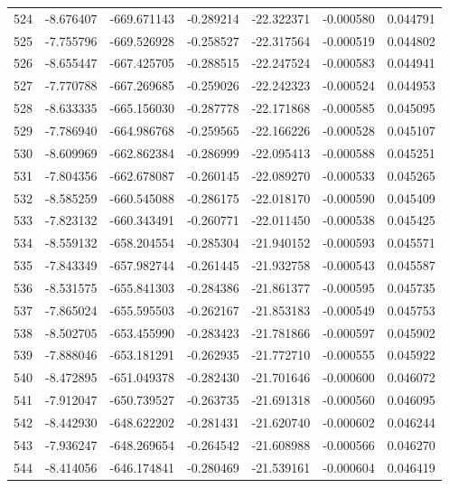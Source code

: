 \begin{tabular}{rrrrrrr}
 524 &  -8.676407 & -669.671143 & -0.289214 &  -22.322371 &   -0.000580 &  0.044791 \\
 525 &  -7.755796 & -669.526928 & -0.258527 &  -22.317564 &   -0.000519 &  0.044802 \\
 526 &  -8.655447 & -667.425705 & -0.288515 &  -22.247524 &   -0.000583 &  0.044941 \\
 527 &  -7.770788 & -667.269685 & -0.259026 &  -22.242323 &   -0.000524 &  0.044953 \\
 528 &  -8.633335 & -665.156030 & -0.287778 &  -22.171868 &   -0.000585 &  0.045095 \\
 529 &  -7.786940 & -664.986768 & -0.259565 &  -22.166226 &   -0.000528 &  0.045107 \\
 530 &  -8.609969 & -662.862384 & -0.286999 &  -22.095413 &   -0.000588 &  0.045251 \\
 531 &  -7.804356 & -662.678087 & -0.260145 &  -22.089270 &   -0.000533 &  0.045265 \\
 532 &  -8.585259 & -660.545088 & -0.286175 &  -22.018170 &   -0.000590 &  0.045409 \\
 533 &  -7.823132 & -660.343491 & -0.260771 &  -22.011450 &   -0.000538 &  0.045425 \\
 534 &  -8.559132 & -658.204554 & -0.285304 &  -21.940152 &   -0.000593 &  0.045571 \\
 535 &  -7.843349 & -657.982744 & -0.261445 &  -21.932758 &   -0.000543 &  0.045587 \\
 536 &  -8.531575 & -655.841303 & -0.284386 &  -21.861377 &   -0.000595 &  0.045735 \\
 537 &  -7.865024 & -655.595503 & -0.262167 &  -21.853183 &   -0.000549 &  0.045753 \\
 538 &  -8.502705 & -653.455990 & -0.283423 &  -21.781866 &   -0.000597 &  0.045902 \\
 539 &  -7.888046 & -653.181291 & -0.262935 &  -21.772710 &   -0.000555 &  0.045922 \\
 540 &  -8.472895 & -651.049378 & -0.282430 &  -21.701646 &   -0.000600 &  0.046072 \\
 541 &  -7.912047 & -650.739527 & -0.263735 &  -21.691318 &   -0.000560 &  0.046095 \\
 542 &  -8.442930 & -648.622202 & -0.281431 &  -21.620740 &   -0.000602 &  0.046244 \\
 543 &  -7.936247 & -648.269654 & -0.264542 &  -21.608988 &   -0.000566 &  0.046270 \\
 544 &  -8.414056 & -646.174841 & -0.280469 &  -21.539161 &   -0.000604 &  0.046419 \\

\end{tabular}
